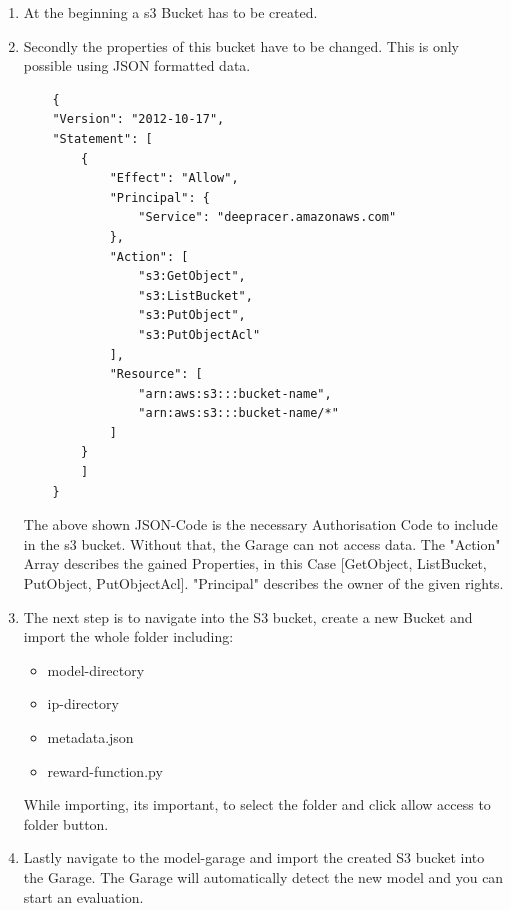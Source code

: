 \begin{enumerate}
    \item At the beginning a s3 Bucket has to be created.
    \item Secondly the properties of this bucket have to be changed. This is only possible using JSON formatted data.
    \begin{listing}[H]
    \begin{verbatim}
    {
    "Version": "2012-10-17",
    "Statement": [
        {
            "Effect": "Allow",
            "Principal": {
                "Service": "deepracer.amazonaws.com"
            },
            "Action": [
                "s3:GetObject",
                "s3:ListBucket",
                "s3:PutObject",
                "s3:PutObjectAcl"
            ],
            "Resource": [
                "arn:aws:s3:::bucket-name",
                "arn:aws:s3:::bucket-name/*"
            ]
        }
        ]
    }
    \end{verbatim}
    \end{listing}
    
    The above shown JSON-Code is the necessary Authorisation Code to include in the s3 bucket. Without that, the Garage can not access data. The "Action" Array describes the gained Properties, in this Case [GetObject, ListBucket, PutObject, PutObjectAcl]. "Principal" describes the owner of the given rights.
    \item The next step is to navigate into the S3 bucket, create a new Bucket and import the whole folder including:
    \begin{itemize}
        \item model-directory
        \item ip-directory
        \item metadata.json
        \item reward-function.py
    \end{itemize}
    While importing, its important, to select the folder and click allow access to folder button.
    \item Lastly navigate to the model-garage and import the created S3 bucket into the Garage. The Garage will automatically detect the new model and you can start an evaluation.
\end{enumerate}

